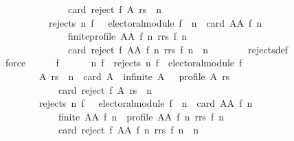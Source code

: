 \begin{isabellebody}
\ \ \ \ \ \ \ \ \ \ \ \ \ \ card\ {\isacharparenleft}{\kern0pt}reject\ f\ A\ rs{\isacharparenright}{\kern0pt}\ {\isacharequal}{\kern0pt}\ n{\isacharparenright}{\kern0pt}{\isacharparenright}{\kern0pt}\ {\isasymand}\isanewline
\ \ \ \ \ \ \ \ \ \ {\isacharparenleft}{\kern0pt}rejects\ n\ f\ {\isasymor}\ {\isasymnot}\ electoral{\isacharunderscore}{\kern0pt}module\ f\ {\isasymor}\ {\isacharparenleft}{\kern0pt}n\ {\isasymle}\ card\ {\isacharparenleft}{\kern0pt}AA\ f\ n{\isacharparenright}{\kern0pt}\ {\isasymand}\isanewline
\ \ \ \ \ \ \ \ \ \ \ \ \ \ finite{\isacharunderscore}{\kern0pt}profile\ {\isacharparenleft}{\kern0pt}AA\ f\ n{\isacharparenright}{\kern0pt}\ {\isacharparenleft}{\kern0pt}rrs\ f\ n{\isacharparenright}{\kern0pt}{\isacharparenright}{\kern0pt}\ {\isasymand}\isanewline
\ \ \ \ \ \ \ \ \ \ \ \ \ \ card\ {\isacharparenleft}{\kern0pt}reject\ f\ {\isacharparenleft}{\kern0pt}AA\ f\ n{\isacharparenright}{\kern0pt}\ {\isacharparenleft}{\kern0pt}rrs\ f\ n{\isacharparenright}{\kern0pt}{\isacharparenright}{\kern0pt}\ {\isasymnoteq}\ n{\isacharparenright}{\kern0pt}{\isachardoublequoteclose}\isanewline
\ \ \ \ \ \ \isamarkupfalse%
\ rejects{\isacharunderscore}{\kern0pt}def\isanewline
\ \ \ \ \ \ \isamarkupfalse%
\ force\isanewline
\ \ \ \ \isamarkupfalse%
\ f{}{\isacharcolon}{\kern0pt}\isanewline
\ \ \ \ \ \ {\isachardoublequoteopen}{\isasymforall}n\ f{\isachardot}{\kern0pt}\ {\isacharparenleft}{\kern0pt}{\isasymnot}\ rejects\ n\ f\ {\isasymor}\ electoral{\isacharunderscore}{\kern0pt}module\ f\ {\isasymand}\isanewline
\ \ \ \ \ \ \ \ {\isacharparenleft}{\kern0pt}{\isasymforall}A\ rs{\isachardot}{\kern0pt}\ {\isasymnot}\ n\ {\isasymle}\ card\ A\ {\isasymor}\ infinite\ A\ {\isasymor}\ {\isasymnot}\ profile\ A\ rs\ {\isasymor}\isanewline
\ \ \ \ \ \ \ \ \ \ \ \ card\ {\isacharparenleft}{\kern0pt}reject\ f\ A\ rs{\isacharparenright}{\kern0pt}\ {\isacharequal}{\kern0pt}\ n{\isacharparenright}{\kern0pt}{\isacharparenright}{\kern0pt}\ {\isasymand}\isanewline
\ \ \ \ \ \ \ \ {\isacharparenleft}{\kern0pt}rejects\ n\ f\ {\isasymor}\ {\isasymnot}\ electoral{\isacharunderscore}{\kern0pt}module\ f\ {\isasymor}\ n\ {\isasymle}\ card\ {\isacharparenleft}{\kern0pt}AA\ f\ n{\isacharparenright}{\kern0pt}\ {\isasymand}\isanewline
\ \ \ \ \ \ \ \ \ \ \ \ finite\ {\isacharparenleft}{\kern0pt}AA\ f\ n{\isacharparenright}{\kern0pt}\ {\isasymand}\ profile\ {\isacharparenleft}{\kern0pt}AA\ f\ n{\isacharparenright}{\kern0pt}\ {\isacharparenleft}{\kern0pt}rrs\ f\ n{\isacharparenright}{\kern0pt}\ {\isasymand}\isanewline
\ \ \ \ \ \ \ \ \ \ \ \ card\ {\isacharparenleft}{\kern0pt}reject\ f\ {\isacharparenleft}{\kern0pt}AA\ f\ n{\isacharparenright}{\kern0pt}\ {\isacharparenleft}{\kern0pt}rrs\ f\ n{\isacharparenright}{\kern0pt}{\isacharparenright}{\kern0pt}\ {\isasymnoteq}\ n{\isacharparenright}{\kern0pt}{\isachardoublequoteclose}\isanewline

\end{isabellebody}
